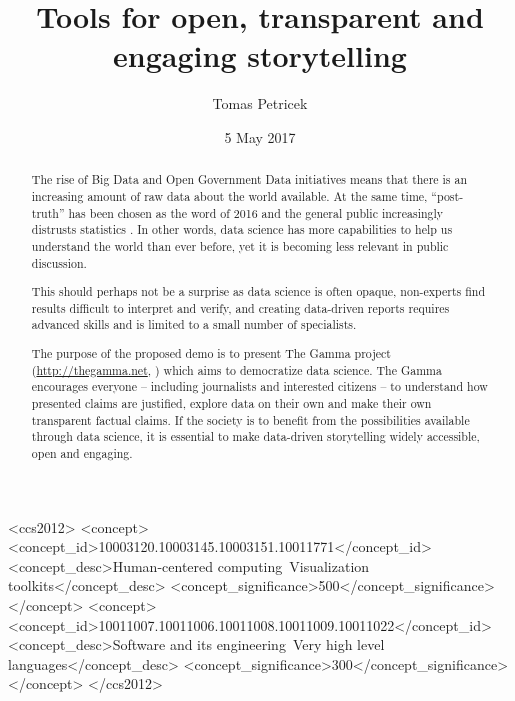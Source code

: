 \documentclass[sigconf,english]{acmart}
\begin{document}


\title{Tools for open, transparent and engaging storytelling}

\author{Tomas Petricek}

\date{5 May 2017}

\begin{abstract}
The rise of Big Data and Open Government Data initiatives means that there is an increasing amount
of raw data about the world available. At the same time, ``post-truth'' has been chosen as the word 
of 2016 \cite{bbc} and the general public increasingly distrusts statistics \cite{guardian}. In 
other words, data science has more capabilities to help us understand the world than ever before, 
yet it is becoming less relevant in public discussion.

This should perhaps not be a surprise as data science is often opaque, non-experts find results 
difficult to interpret and verify, and creating data-driven reports requires advanced skills and 
is limited to a small number of specialists. 

The purpose of the proposed demo is to present The Gamma project (\url{http://thegamma.net}, \cite{dot}) 
which aims to democratize data science. The Gamma encourages everyone -- including journalists and 
interested citizens -- to understand how presented claims are justified, explore data on their own 
and make their own transparent factual claims. If the society is to benefit from the possibilities 
available through data science, it is essential to make data-driven storytelling widely accessible, 
open and engaging.
\end{abstract}


\begin{CCSXML}
<ccs2012>
<concept>
<concept_id>10003120.10003145.10003151.10011771</concept_id>
<concept_desc>Human-centered computing~Visualization toolkits</concept_desc>
<concept_significance>500</concept_significance>
</concept>
<concept>
<concept_id>10011007.10011006.10011008.10011009.10011022</concept_id>
<concept_desc>Software and its engineering~Very high level languages</concept_desc>
<concept_significance>300</concept_significance>
</concept>
</ccs2012>
\end{CCSXML}
\end{document}
